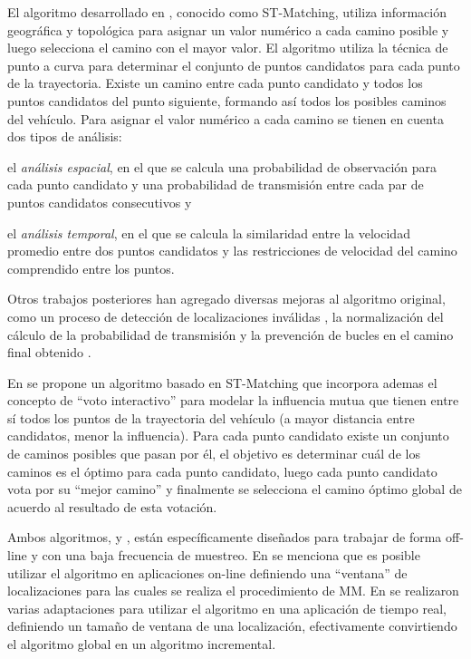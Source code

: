 El algoritmo desarrollado en \cite{lou2009map}, conocido como ST-Matching, utiliza información geográfica y topológica para asignar un valor numérico a cada camino posible y luego selecciona el camino con el mayor valor. El algoritmo utiliza la técnica de punto a curva para determinar el conjunto de puntos candidatos para cada punto de la trayectoria. Existe un camino entre cada punto candidato y todos los puntos candidatos del punto siguiente, formando así todos los posibles caminos del vehículo. Para asignar el valor numérico a cada camino se tienen en cuenta dos tipos de análisis: \begin{enumerate*}[a)] \item el \emph{análisis espacial}, en el que se calcula una probabilidad de observación para cada punto candidato y una probabilidad de transmisión entre cada par de puntos candidatos consecutivos y \item el \emph{análisis temporal}, en el que se calcula la similaridad entre la velocidad promedio entre dos puntos candidatos y las restricciones de velocidad del camino comprendido entre los puntos.\end{enumerate*} Otros trabajos posteriores han agregado diversas mejoras al algoritmo original, como un proceso de detección de localizaciones inválidas \cite{sakic2012map}, la normalización del cálculo de la probabilidad de transmisión y la prevención de bucles en el camino final obtenido \cite{budigm2012algorithm}.

En \cite{yuan2010interactive} se propone un algoritmo basado en ST-Matching que incorpora ademas el concepto de “voto interactivo” para modelar la influencia mutua que tienen entre sí todos los puntos de la trayectoria del vehículo (a mayor distancia entre candidatos, menor la influencia). Para cada punto candidato existe un conjunto de caminos posibles que pasan por él, el objetivo es determinar cuál de los caminos es el óptimo para cada punto candidato, luego cada punto candidato vota por su “mejor camino” y finalmente se selecciona el camino óptimo global de acuerdo al resultado de esta votación.

Ambos algoritmos, \cite{lou2009map} y \cite{yuan2010interactive}, están específicamente diseñados para trabajar de forma off-line y con una baja frecuencia de muestreo. En \cite{lou2009map} se  menciona que es posible utilizar el algoritmo en aplicaciones on-line definiendo una “ventana” de localizaciones para las cuales se realiza el procedimiento de MM. En \cite{sakic2012map} se realizaron varias adaptaciones para utilizar el algoritmo en una aplicación de tiempo real, definiendo un tamaño de ventana de una localización, efectivamente convirtiendo el algoritmo global en un algoritmo incremental.

